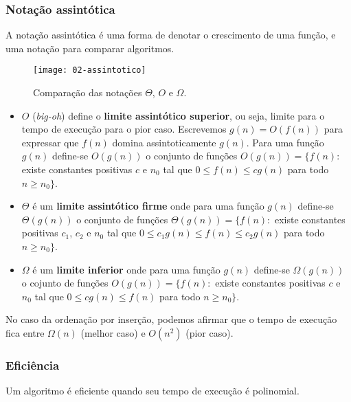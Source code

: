 \subsubsection{Notação assintótica}

A notação assintótica é uma forma de denotar o crescimento de uma função,
e uma notação para comparar algoritmos.
%
\begin{figure}[ht]
\centering
\texttt{[image: 02-assintotico]}
\caption{Comparação das notações $\Theta$, $O$ e $\Omega$.}
\label{aula02:fig:assintotico}
\end{figure}

\begin{itemize}
\item $O$ (\emph{big-oh}) define o {\bf limite assintótico superior}, ou seja, 
limite para o tempo de execução para o pior caso. Escrevemos $g(n) = O(f(n))$ para
expressar que $f(n)$ domina assintoticamente $g(n)$. Para
uma função $g(n)$ define-se $O(g(n))$ o conjunto de funções 
$O(g(n)) = \{f(n):$ existe constantes positivas $c$ e $n_0$ tal que $0 \leq f(n) \leq c g(n)$ 
para todo $n \geq n_0\}$.

\item $\Theta$ é um {\bf limite assintótico firme} onde 
para uma função $g(n)$ define-se $\Theta(g(n))$ o conjunto de funções 
$\Theta(g(n)) = \{f(n):$ existe constantes positivas $c_1$, $c_2$ e $n_0$ tal que 
$0 \leq c_1 g(n) \leq f(n) \leq c_2 g(n)$ 
para todo $n \geq n_0\}$.

\item $\Omega$ é um {\bf limite inferior} onde para uma função $g(n)$ 
define-se $\Omega(g(n))$ o cojunto de funções
$O(g(n)) = \{f(n):$ existe constantes positivas $c$ e $n_0$ tal que $0 \leq c g(n) \leq f(n)$ 
para todo $n \geq n_0\}$.

\end{itemize}

No caso da ordenação por inserção, podemos afirmar que o tempo de execução fica entre
$\Omega(n)$ (melhor caso) e $O(n^2)$ (pior caso).

\subsubsection{Eficiência}

\begin{framed}
\centering
Um algoritmo é eficiente quando seu tempo de execução é polinomial.
\end{framed}


